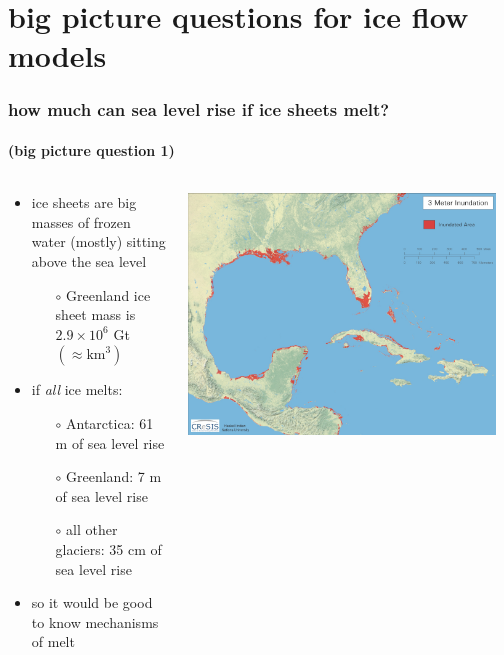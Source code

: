 \documentclass[hide notes,intlimits]{beamer}
\begin{document}
\section[big picture questions]{big picture questions for ice flow models}

\begin{frame}
  \frametitle{how much can sea level rise if ice sheets melt?}
  \framesubtitle{(big picture question 1)}

\begin{columns}
\begin{column}{0.6\textwidth}
\begin{itemize}
\item ice sheets are big masses of frozen water (mostly) sitting above the sea level
    \begin{itemize}
    \item[$\circ$] Greenland ice sheet mass is $2.9 \times 10^6$ Gt \quad $(\approx \text{km}^3)$ %
    \end{itemize}
\item if \emph{all} ice melts:
    \begin{itemize}
    \item[$\circ$] Antarctica: 61 m of sea level rise
    \item[$\circ$] Greenland: 7 m of sea level rise
    \item[$\circ$] all other glaciers: 35 cm of sea level rise
    \end{itemize}
\item so it would be good to know mechanisms of melt
\end{itemize}
\end{column}
\begin{column}{0.4\textwidth}

\includegraphics[width=0.95\textwidth]{southeastern_us_3m}
\end{column}
\end{columns}
\end{frame}
\end{document}
